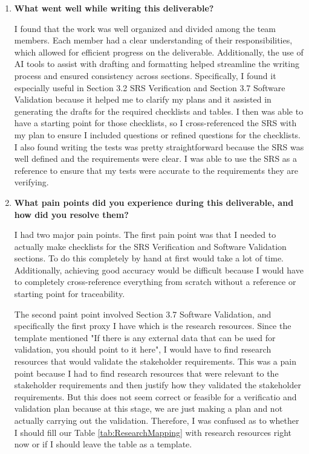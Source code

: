\documentclass[10pt,titlepage]{article}
\begin{document}
\begin{enumerate}
  \item \textbf{What went well while writing this deliverable?}

  I found that the work was well organized and divided among the team members. Each member had a clear understanding of their responsibilities, 
  which allowed for efficient progress on the deliverable. Additionally, the use of AI tools to assist with drafting and formatting helped streamline 
  the writing process and ensured consistency across sections. Specifically, I found it especially useful in Section 3.2 SRS Verification and Section 3.7
  Software Validation because it helped me to clarify my plans and it assisted in generating the drafts for the required checklists and tables. I then was able 
  to have a starting point for those checklists, so I cross-referenced the SRS with my plan to ensure I included questions or refined questions for the checklists. 
  I also found writing the tests was pretty straightforward because the SRS was well defined and the requirements were clear. I was able to use the SRS as a 
  reference to ensure that my tests were accurate to the requirements they are verifying.

  \item \textbf{What pain points did you experience during this deliverable, and how did you resolve them?}
  
  I had two major pain points. The first pain point was that I needed to actually make checklists for the SRS Verification and Software Validation sections. To do this 
  completely by hand at first would take a lot of time. Additionally, achieving good accuracy would be difficult because I would have to completely cross-reference 
  everything from scratch without a reference or starting point for traceability. 
  
  The second paint point involved Section 3.7 Software Validation, and specifically the first proxy I have which is the research resources. Since the template mentioned 
  "If there is any external data that can be used for validation, you should point to it here", I would have to find research resources that would validate the 
  stakeholder requirements. This was a pain point because I had to find research resources that were relevant to the stakeholder requirements and then justify how they 
  validated the stakeholder requirements. But this does not seem correct or feasible for a verificatio and validation plan because at this stage, we are just making a 
  plan and not actually carrying out the validation. Therefore, I was confused as to whether I should fill our Table \ref{tab:ResearchMapping} with research resources 
  right now or if I should leave the table as a template.
  

\end{enumerate}
\end{document}

